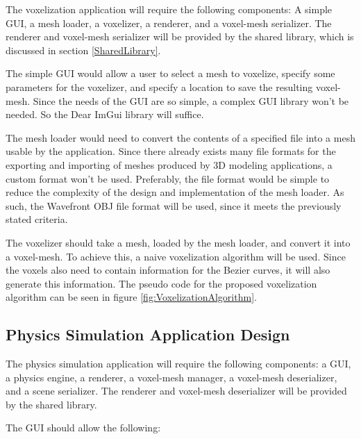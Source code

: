 The voxelization application will require the following components: A simple GUI, a mesh loader,
a voxelizer, a renderer, and a voxel-mesh serializer. The renderer and voxel-mesh serializer will 
be provided by the shared library, which is discussed in section \ref{SharedLibrary}. 

The simple GUI would allow a user to select a mesh to voxelize, specify some parameters for the 
voxelizer, and specify a location to save the resulting voxel-mesh. Since the needs of the GUI are 
so simple, a complex GUI library won't be needed. So the Dear ImGui library will suffice.

The mesh loader would need to convert the contents of a specified file into a mesh usable by the
application. Since there already exists many file formats for the exporting and importing of meshes
produced by 3D modeling applications, a custom format won't be used. Preferably, the file format 
would be simple to reduce the complexity of the design and implementation of the mesh loader. As
such, the Wavefront OBJ file format will be used, since it meets the previously stated criteria.

The voxelizer should take a mesh, loaded by the mesh loader, and convert it into a voxel-mesh. To
achieve this, a naive voxelization algorithm will be used. Since the voxels also need to contain
information for the Bezier curves, it will also generate this information. The pseudo code for the 
proposed voxelization algorithm can be seen in figure \ref{fig:VoxelizationAlgorithm}.



\subsection{Physics Simulation Application Design}

The physics simulation application will require the following components: a GUI, a physics 
engine, a renderer, a voxel-mesh manager, a voxel-mesh deserializer, and a scene serializer. The 
renderer and voxel-mesh deserializer will be provided by the shared library.

The GUI should allow the following:

